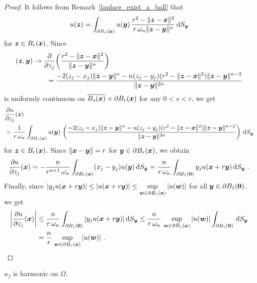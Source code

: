 \begin{proof}
It follows from Remark~\ref{laplace_exist_a_ball} that
\[
u(\VEC{z}) = \int_{\partial B_r(\VEC{x})} u(\VEC{y}) \,
\frac{r^2-\|\VEC{z}-\VEC{x}\|^2}{r\, \omega_n \|\VEC{z}-\VEC{y}\|^n} \dss{S}{y}
\]
for $\VEC{z} \in B_r(\VEC{x})$.  Since
\begin{align*}
(\VEC{z},\VEC{y}) &\to
\pdfdx{\left(\frac{r^2-\|\VEC{z}-\VEC{x}\|^2}
{\|\VEC{z}-\VEC{y}\|^n}\right)}{z_j} \\
&\qquad = \frac{-2(z_j-x_j) \|\VEC{z}-\VEC{y}\|^n
- n (z_j-y_j)(r^2 - \|\VEC{z}-\VEC{x}\|^2)
\|\VEC{z}-\VEC{y}\|^{n-2}}{\|\VEC{z}-\VEC{y}\|^{2n}}
\end{align*}
is uniformly continuous on
$\overline{B_s(\VEC{x})} \times \partial B_r(\VEC{x})$ for any $0<s<r$,
we get
\begin{align*}
&\pdydx{u}{z_j}(\VEC{z}) \\
& = \frac{1}{r\,\omega_n}
\int_{\partial B_r(\VEC{x})} u(\VEC{y}) \,
\left( \frac{-2(z_j-x_j) \|\VEC{z}-\VEC{y}\|^n
- n(z_j-y_j) (r^2 - \|\VEC{z}-\VEC{x}\|^2)
\|\VEC{z}-\VEC{y}\|^{n-2}}{\|\VEC{z}-\VEC{y}\|^{2n}} \right) \dss{S}{y}
\end{align*}
for $\VEC{z} \in B_r(\VEC{x})$.  Since
$\|\VEC{x}-\VEC{y}\| = r$ for $\VEC{y}\in \partial B_r(\VEC{x})$, we obtain
\[
\pdydx{u}{z_j}(\VEC{x}) = -\frac{n}{r^{n+1}\,\omega_n}
\int_{\partial B_r(\VEC{x})} (x_j-y_j) u(\VEC{y}) \dss{S}{y}
= \frac{n}{r\,\omega_n}
\int_{\partial B_1(\VEC{0})} y_j u(\VEC{x} + r\VEC{y}) \dss{S}{y} \ .
\]
Finally, since
$\DS
| y_j u(\VEC{x} + r\VEC{y}) | \leq
|u(\VEC{x} + r\VEC{y}) | \leq \sup_{\VEC{w}\in \partial B_r(\VEC{x})} |u(\VEC{w})|$
for all $\VEC{y} \in \partial B_1(\VEC{0})$, we get
\begin{align*}
\left|\pdydx{u}{z_j}(\VEC{x})\right|
& \leq \frac{n}{r\,\omega_n}
\int_{\partial B_1(\VEC{0})} |y_j u(\VEC{x} + r\VEC{y})| \dss{S}{y}
\leq \frac{n}{r\,\omega_n}\,\sup_{\VEC{w}\in \partial B_r(\VEC{x})} |u(\VEC{w})|
\int_{\partial B_1(\VEC{0})} \dss{S}{y} \\
&= \frac{n}{r}\,\sup_{\VEC{w}\in \partial B_r(\VEC{x})} |u(\VEC{w})| \ . \qedhere 
\end{align*}
\end{proof}

\begin{lemma} \label{PerronLem7}
$u_f$ is harmonic on $\Omega$.
\end{lemma}

